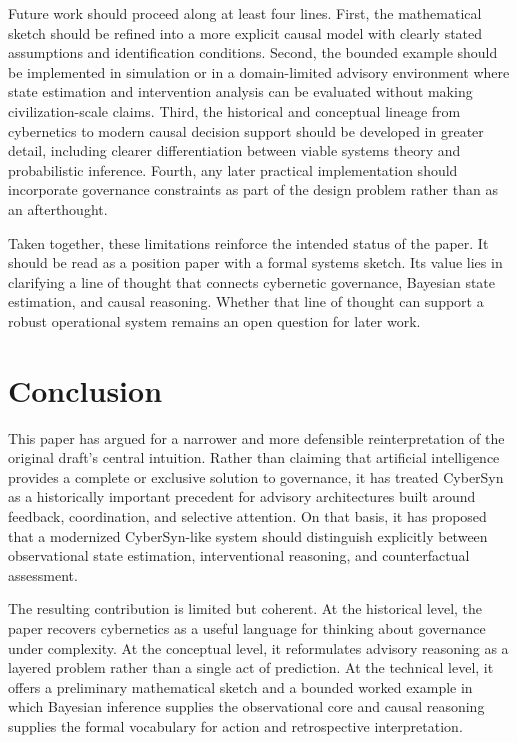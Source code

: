 \documentclass[11pt]{article}
\begin{document}
Future work should proceed along at least four lines. First, the mathematical sketch should be refined into a more explicit causal model with clearly stated assumptions and identification conditions. Second, the bounded example should be implemented in simulation or in a domain-limited advisory environment where state estimation and intervention analysis can be evaluated without making civilization-scale claims. Third, the historical and conceptual lineage from cybernetics to modern causal decision support should be developed in greater detail, including clearer differentiation between viable systems theory and probabilistic inference. Fourth, any later practical implementation should incorporate governance constraints as part of the design problem rather than as an afterthought.

Taken together, these limitations reinforce the intended status of the paper. It should be read as a position paper with a formal systems sketch. Its value lies in clarifying a line of thought that connects cybernetic governance, Bayesian state estimation, and causal reasoning. Whether that line of thought can support a robust operational system remains an open question for later work.

\section{Conclusion}

This paper has argued for a narrower and more defensible reinterpretation of the original draft's central intuition. Rather than claiming that artificial intelligence provides a complete or exclusive solution to governance, it has treated CyberSyn as a historically important precedent for advisory architectures built around feedback, coordination, and selective attention. On that basis, it has proposed that a modernized CyberSyn-like system should distinguish explicitly between observational state estimation, interventional reasoning, and counterfactual assessment.

The resulting contribution is limited but coherent. At the historical level, the paper recovers cybernetics as a useful language for thinking about governance under complexity. At the conceptual level, it reformulates advisory reasoning as a layered problem rather than a single act of prediction. At the technical level, it offers a preliminary mathematical sketch and a bounded worked example in which Bayesian inference supplies the observational core and causal reasoning supplies the formal vocabulary for action and retrospective interpretation.
\end{document}
